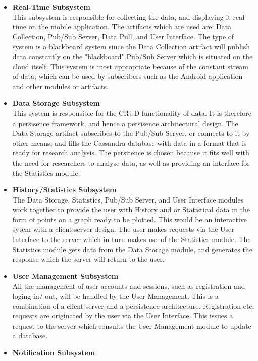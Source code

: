 \begin{itemize}
	\item \textbf{Real-Time Subsystem}\\
	This subsystem is responsible for collecting the data, and displaying it real-time on the mobile application. The artifacts which are used are: Data Collection,  Pub/Sub Server, Data Pull, and User Interface. The type of system is a blackboard system since the Data Collection artifact will publish data constantly on the "blackboard" Pub/Sub Server which is situated on the cloud itself. This system is most appropriate because of the constant stream of data, which can be used by subscribers such as the Android application and other modules or artifacts. 
	\item \textbf{Data Storage Subsystem}\\
	This system is responsible for the CRUD functionality of data. It is therefore a persisence framework, and hence a persisence architectural design. The Data Storage artifact subscribes to the Pub/Sub Server, or connects to it by other means, and fills the Cassandra database with data in a format that is ready for research analysis. The persitence is chosen because it fits well with the need for researchers to analyse data, as well as providing an interface for the Statistics module. 
	\item \textbf{History/Statistics Subsystem}\\
	The Data Storage, Statistics, Pub/Sub Server, and User Interface modules work together to provide the user with History and or Statistical data in the form of points on a graph ready to be plotted. This would be an interactive sytem with a client-server design. The user makes requests via the User Interface to the server which in turn makes use of the Statistics module. The Statistics module gets data from the Data Storage module, and generates the response which the server will return to the user.
	\item \textbf{User Management Subsystem}\\
	All the management of user accounts and sessions, such as registration and loging in/ out, will be handled by the User Management. This is a combination of a client-server and a persistence architecture. Registration etc. requests are originated by the user via the User Interface. This issues a request to the server which consults the User Management module to update a database. 
	\item \textbf{Notification Subsystem}\\

\end{itemize}
